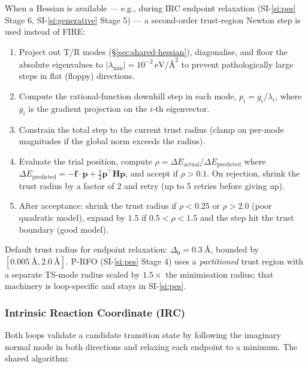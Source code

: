 When a Hessian is available --- e.g., during IRC endpoint relaxation (SI-\ref{si:pes} Stage 6, SI-\ref{si:generative} Stage 5) --- a second-order trust-region Newton step is used instead of FIRE:
\begin{enumerate}
    \item Project out T/R modes (\S\ref{sec:shared-hessian}), diagonalise, and floor the absolute eigenvalues to $|\lambda_\text{min}| = 10^{-2}\,\text{eV/\AA}^2$ to prevent pathologically large steps in flat (floppy) directions.
    \item Compute the rational-function downhill step in each mode, $p_i = g_i / \lambda_i$, where $g_i$ is the gradient projection on the $i$-th eigenvector.
    \item Constrain the total step to the current trust radius (clamp on per-mode magnitudes if the global norm exceeds the radius).
    \item Evaluate the trial position, compute $\rho = \Delta E_\text{actual} / \Delta E_\text{predicted}$ where $\Delta E_\text{predicted} = -\mathbf{f}\cdot\mathbf{p} + \tfrac{1}{2}\mathbf{p}^\top\mathbf{H}\mathbf{p}$, and accept if $\rho > 0.1$. On rejection, shrink the trust radius by a factor of $2$ and retry (up to 5 retries before giving up).
    \item After acceptance: shrink the trust radius if $\rho < 0.25$ or $\rho > 2.0$ (poor quadratic model), expand by $1.5$ if $0.5 < \rho < 1.5$ and the step hit the trust boundary (good model).
\end{enumerate}
Default trust radius for endpoint relaxation: $\Delta_0 = \SI{0.3}{\angstrom}$, bounded by $[\SI{0.005}{\angstrom}, \SI{2.0}{\angstrom}]$. P-RFO (SI-\ref{si:pes} Stage 4) uses a \emph{partitioned} trust region with a separate TS-mode radius scaled by $1.5\times$ the minimisation radius; that machinery is loop-specific and stays in SI-\ref{si:pes}.


\subsubsection{Intrinsic Reaction Coordinate (IRC)}
\label{sec:shared-irc}

Both loops validate a candidate transition state by following the imaginary normal mode in both directions and relaxing each endpoint to a minimum. The shared algorithm:

